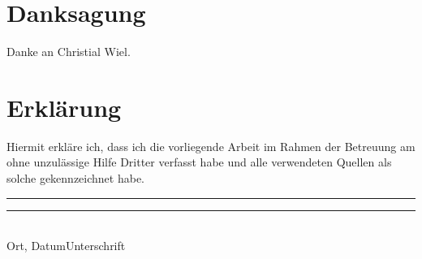 
\printbibliography
\cleardoublepage
\pagestyle{empty}
\section*{Danksagung} %
Danke an Christial Wiel.
\cleardoublepage
\section*{Erklärung}
Hiermit erkläre ich, dass ich die vorliegende Arbeit im Rahmen der Betreuung am
\institut{} ohne unzulässige Hilfe Dritter verfasst habe und alle verwendeten
Quellen als solche gekennzeichnet habe.

\vspace{5\baselineskip}
\noindent
\rule[0.5ex]{20em}{0.5pt}\rule[0.5ex]{10em}{0.5pt}\\
Ort, Datum\hspace{8em}Unterschrift 
